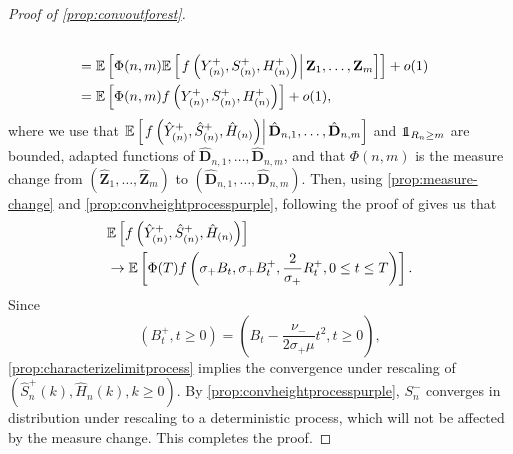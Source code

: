 \begin{proof}[Proof of \cref{prop:convoutforest}]
\begin{align*}
 \\&={\mathbb E}\left[ \Phi(n,m){\mathbb E}\left[\left.f\left(Y^+_{(n)}, S^+_{(n)},  H^+_{(n)}\right)\right| \mathbf{Z}_1,\dots, \mathbf{Z}_m\right]\right]+o(1)\\&={\mathbb E}\left[ \Phi(n,m)f\left(Y^+_{(n)},S^+_{(n)},  H^+_{(n)}\right)\right]+o(1),
\end{align*}
where we use that ${\mathbb E}\left[\left. f\left(\hat{Y}^+_{(n)},\hat{S}^+_{(n)},  \hat{H}_{(n)}\right)\right| \hat{\mathbf{D}}_{n,1},\dots, \hat{\mathbf{D}}_{n,m}\right]$ and $\one_{R_n\geq m}$ are bounded, adapted functions of $\hat{\mathbf{D}}_{n,1},\dots, \hat{\mathbf{D}}_{n,m}$, and that $\Phi(n,m)$ is the measure change from  $(\hat{\mathbf{Z}}_{1},\dots, \hat{\mathbf{Z}}_{m})$ to $(\hat{\mathbf{D}}_{n,1},\dots, \hat{\mathbf{D}}_{n,m})$. Then, using \cref{prop:measure-change} and \cref{prop:convheightprocesspurple}, following the proof of \cite[Theorem 4.1]{conchon--kerjanStableGraphMetric2020} gives us that 
\begin{align*}
    &{\mathbb E}\left[f\left(\hat{Y}^+_{(n)},\hat{S}^+_{(n)},  \hat{H}_{(n)}\right) \right]\\
    &\to {\mathbb E}\left[\Phi(T)f\left(\sigma_+ B_t,\sigma_+ B^+_t,\frac{2}{\sigma_+}R^+_t,0\leq t \leq T\right)\right].
\end{align*}
Since $$(B^+_t,t\geq 0)=\left(B_t-\frac{\nu_-}{2\sigma_+ \mu}t^2,t\geq 0\right),$$
 \cref{prop:characterizelimitprocess} implies the convergence under rescaling of $(\hat{S}^+_n(k),\hat{H}_n(k),k\geq 0)$. By \cref{prop:convheightprocesspurple}, $S^{-}_n$ converges in distribution under rescaling to a deterministic process, which will not be affected by the measure change. This completes the proof. 
\end{proof}

